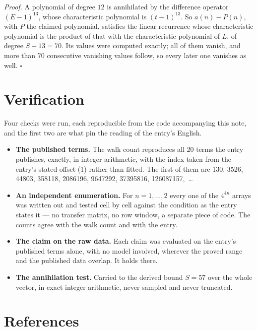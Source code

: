 \documentclass[11pt]{article}
\theoremstyle{definition}
\begin{document}
{\itshape Proof.} A polynomial of degree $12$ is annihilated by the difference operator $(E-1)^{13}$, whose characteristic polynomial is $(t-1)^{13}$. So $a(n) - P(n)$, with $P$ the claimed polynomial, satisfies the linear recurrence whose characteristic polynomial is the product of that with the characteristic polynomial of $L$, of degree $S + 13 = 70$. Its values were computed exactly; all of them vanish, and more than $70$ consecutive vanishing values follow, so every later one vanishes as well. $\square$

\section{Verification}

Four checks were run, each reproducible from the code accompanying this note, and the first two are what pin the reading of the entry's English.

\begin{itemize}

\item {\bfseries The published terms.} The walk count reproduces all 20 terms the entry publishes, exactly, in integer arithmetic, with the index taken from the entry's stated offset (1) rather than fitted. The first of them are 130, 3526, 44803, 358118, 2086196, 9647292, 37395816, 126087157,~\dots

\item {\bfseries An independent enumeration.} For $n = 1,\dots,2$ every one of the $4^{4n}$ arrays was written out and tested cell by cell against the condition as the entry states it --- no transfer matrix, no row window, a separate piece of code. The counts agree with the walk count and with the entry.

\item {\bfseries The claim on the raw data.} Each claim was evaluated on the entry's published terms alone, with no model involved, wherever the proved range and the published data overlap. It holds there.

\item {\bfseries The annihilation test.} Carried to the derived bound $S = 57$ over the whole vector, in exact integer arithmetic, never sampled and never truncated.

\end{itemize}

\section{References}
\end{document}
